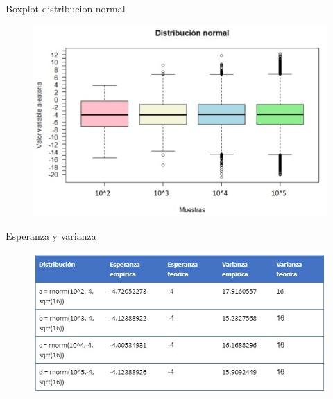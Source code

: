 \documentclass{beamer}
\begin{document}
\begin{frame}{Boxplot distribucion normal}
\begin{figure}[htpb]
        \begin{center}
            \includegraphics[width=0.8\linewidth]{pic/ej2_box.jpeg}
        \end{center}
    \end{figure}
    
\end{frame}

\begin{frame}{Esperanza y varianza}
\begin{figure}[htpb]
        \begin{center}
            \includegraphics[width=0.8\linewidth]{pic/ej2_tabla.jpeg}
        \end{center}
    \end{figure}
    
\end{frame}
\end{document}
